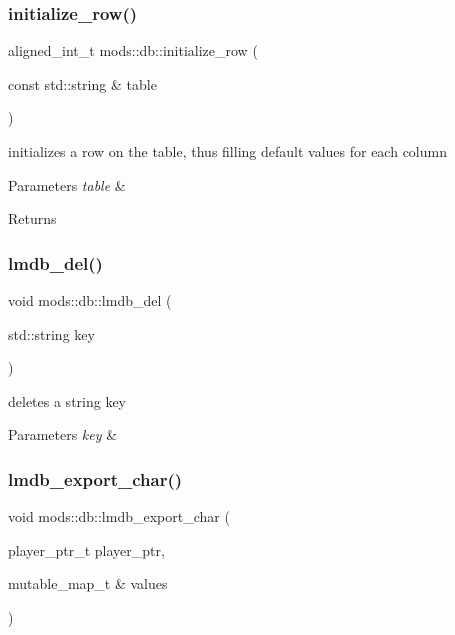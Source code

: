 \subsubsection{\texorpdfstring{initialize\+\_\+row()}{initialize\_row()}}
{\footnotesize\ttfamily aligned\+\_\+int\+\_\+t mods\+::db\+::initialize\+\_\+row (\begin{DoxyParamCaption}\item[{const std\+::string \&}]{table }\end{DoxyParamCaption})}



initializes a row on the table, thus filling default values for each column 


\begin{DoxyParams}{Parameters}
{\em table} & \\
\hline
\end{DoxyParams}
\begin{DoxyReturn}{Returns}

\end{DoxyReturn}
\mbox{\label{namespacemods_1_1db_a5fbce517ac53231aa35c7d9c58622ce2}} 
\subsubsection{\texorpdfstring{lmdb\+\_\+del()}{lmdb\_del()}}
{\footnotesize\ttfamily void mods\+::db\+::lmdb\+\_\+del (\begin{DoxyParamCaption}\item[{std\+::string}]{key }\end{DoxyParamCaption})}



deletes a string key 


\begin{DoxyParams}{Parameters}
{\em key} & \\
\hline
\end{DoxyParams}
\mbox{\label{namespacemods_1_1db_a2cb0a00d3700b5eab314405d909a8cce}} 
\subsubsection{\texorpdfstring{lmdb\+\_\+export\+\_\+char()}{lmdb\_export\_char()}}
{\footnotesize\ttfamily void mods\+::db\+::lmdb\+\_\+export\+\_\+char (\begin{DoxyParamCaption}\item[{player\+\_\+ptr\+\_\+t}]{player\+\_\+ptr,  }\item[{mutable\+\_\+map\+\_\+t \&}]{values }\end{DoxyParamCaption})}



